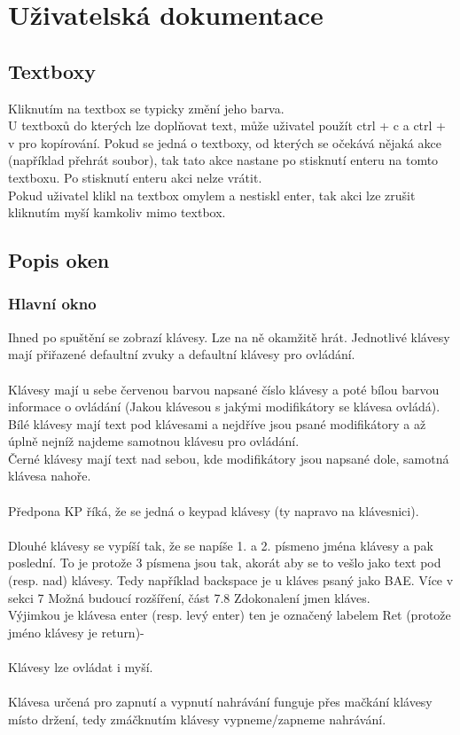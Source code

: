 \documentclass[12pt]{article}
\begin{document}
	\newpage  
	\maketitle\section{Uživatelská dokumentace}
	\subsection{Textboxy}
	Kliknutím na textbox se typicky změní jeho barva.
	\\
	U textboxů do kterých lze doplňovat text, může uživatel použít ctrl + c a ctrl + v pro kopírování. Pokud se jedná o textboxy, od kterých se očekává nějaká akce (například přehrát soubor), tak tato akce nastane po stisknutí enteru na tomto textboxu. Po stisknutí enteru akci nelze vrátit.
	\\
	 Pokud uživatel klikl na textbox omylem a nestiskl enter, tak akci lze zrušit kliknutím myší kamkoliv mimo textbox. 
	\subsection{Popis oken}
	\subsubsection{Hlavní okno}
	Ihned po spuštění se zobrazí klávesy. Lze na ně okamžitě hrát. Jednotlivé klávesy mají přiřazené defaultní zvuky a defaultní klávesy pro ovládání. 
	\\
	\\
	Klávesy mají u sebe červenou barvou napsané číslo klávesy a poté bílou barvou informace o ovládání (Jakou klávesou s jakými modifikátory se klávesa ovládá). 
	\\
	Bílé klávesy mají text pod klávesami a nejdříve jsou psané modifikátory a až úplně nejníž najdeme samotnou klávesu pro ovládání.
	\\
	Černé klávesy mají text nad sebou, kde modifikátory jsou napsané dole, samotná klávesa nahoře. 
	\\
	\\
	Předpona KP říká, že se jedná o keypad klávesy (ty napravo na klávesnici).
	\\
	\\
	Dlouhé klávesy se vypíší tak, že se napíše 1. a 2. písmeno jména klávesy a pak poslední. To je protože 3 písmena jsou tak, akorát aby se to vešlo jako text pod (resp. nad) klávesy. Tedy například backspace je u kláves psaný jako BAE. Více v sekci 7 Možná budoucí rozšíření, část 7.8 Zdokonalení jmen kláves.
	\\
	Výjimkou je klávesa enter (resp. levý enter) ten je označený labelem Ret (protože jméno klávesy je return)-
	\\
	\\
	Klávesy lze ovládat i myší.
	\\
	\\
	Klávesa určená pro zapnutí a vypnutí nahrávání funguje přes mačkání klávesy místo držení, tedy zmáčknutím klávesy vypneme/zapneme nahrávání.
\end{document}
